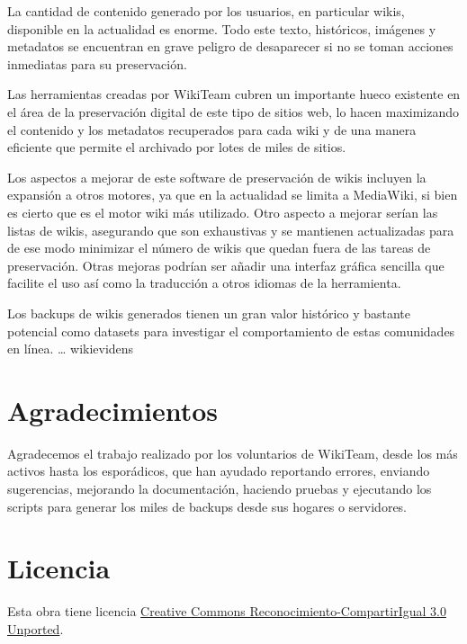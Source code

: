 \documentclass[11pt,twocolumn]{article}
\begin{document}
La cantidad de contenido generado por los usuarios, en particular wikis, disponible en la actualidad es enorme. Todo este texto, históricos, imágenes y metadatos se encuentran en grave peligro de desaparecer si no se toman acciones inmediatas para su preservación.

Las herramientas creadas por WikiTeam cubren un importante hueco existente en el área de la preservación digital de este tipo de sitios web, lo hacen maximizando el contenido y los metadatos recuperados para cada wiki y de una manera eficiente que permite el archivado por lotes de miles de sitios.

Los aspectos a mejorar de este software de preservación de wikis incluyen la expansión a otros motores, ya que en la actualidad se limita a MediaWiki, si bien es cierto que es el motor wiki más utilizado. Otro aspecto a mejorar serían las listas de wikis, asegurando que son exhaustivas y se mantienen actualizadas para de ese modo minimizar el número de wikis que quedan fuera de las tareas de preservación. Otras mejoras podrían ser añadir una interfaz gráfica sencilla que facilite el uso así como la traducción a otros idiomas de la herramienta.

Los backups de wikis generados tienen un gran valor histórico y bastante potencial como datasets para investigar el comportamiento de estas comunidades en línea. … wikievidens

        


\section*{Agradecimientos}

Agradecemos el trabajo realizado por los voluntarios de WikiTeam, desde los más activos hasta los esporádicos, que han ayudado reportando errores, enviando sugerencias, mejorando la documentación, haciendo pruebas y ejecutando los scripts para generar los miles de backups desde sus hogares o servidores.

\section*{Licencia}
Esta obra tiene licencia \href{http://creativecommons.org/licenses/by-sa/3.0/}{Creative Commons Reconocimiento-CompartirIgual 3.0 Unported}.
\end{document}
